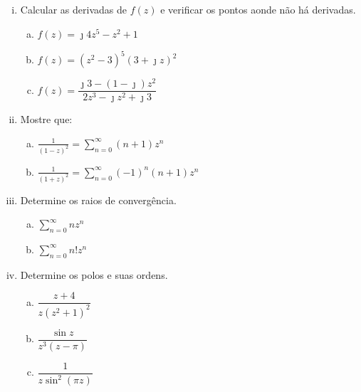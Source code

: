 \begin{enumerate}[i.]
  \item Calcular as derivadas de $f(z)$ e verificar os pontos aonde não há derivadas.
    \begin{enumerate}[a.]
      \item $f(z) = \jmath 4z^{5} - z^{2} + 1$
      \item $f(z) = \left(z^{2} - 3\right)^{5} \left(3 + \jmath z\right)^{2}$
      \item $f(z) = \dfrac{\jmath 3 - \left(1 - \jmath\right)z^{2}}{2z^{3} - \jmath z^{2} + \jmath 3}$
    \end{enumerate}
  \item Mostre que:
    \begin{enumerate}[a.]
      \item $\displaystyle{\frac{1}{\left(1 - z\right)^{2}} = \sum^{\infty}_{n = 0}} \left(n + 1\right)z^{n}$
      \item $\displaystyle{\frac{1}{\left(1 + z\right)^{2}} = \sum^{\infty}_{n = 0}} \left(- 1\right)^{n}\left(n + 1\right)z^{n}$
    \end{enumerate}
  \item Determine os raios de convergência.
    \begin{enumerate}[a.]
      \item $\displaystyle{\sum^{\infty}_{n = 0}nz^{n}}$
      \item $\displaystyle{\sum^{\infty}_{n = 0}n! z^{n}}$
    \end{enumerate}
  \item Determine os polos e suas ordens.
    \begin{enumerate}[a.]
      \item $\dfrac{z + 4}{z\left(z^{2} + 1\right)^{2}}$
      \item $\dfrac{\sin{z}}{z^{3}\left(z - \pi \right)}$
      \item $\dfrac{1}{z \sin^{2}{\left(\pi z\right)}}$
    \end{enumerate}
\end{enumerate}